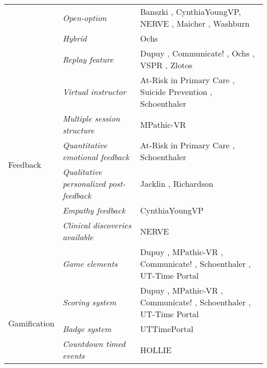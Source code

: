 \begin{table} [t]
{\begin{center}
\begin{tabular}{| p{1.8cm} | p{2cm} | p{8cm} |}
    \cline{2-3}
        & \emph{Open-option} & Banszki \cite{banszki2018clinical,quail2016student}, CynthiaYoungVP\cite{foster2016using}, NERVE
        \cite{hirumi2016advancingPart2,hirumi2016advancing,kleinsmith2015understanding}, Maicher \cite{maicher2017developing}, Washburn \cite{washburn2020virtual} \\
    \cline{2-3}
        & \emph{Hybrid} & Ochs \cite{ochs2019training}  \\
    \hline
        \multirow{8}{*}{Feedback} & \emph{Replay feature} & Dupuy \cite{dupuy2019virtual}, Communicate! \cite{jeuring2015communicate}, Ochs \cite{ochs2019training}, VSPR \cite{peddle2019exploring,peddle2019development}, Zlotos \cite{zlotos2016scenario}\\
    \cline{2-3}
        & \emph{Virtual instructor} & At-Risk in Primary Care \cite{albright2018using}, Suicide Prevention \cite{o2019suicide}, Schoenthaler \cite{schoenthaler2017simulated}\\
    \cline{2-3}
        & \emph{Multiple session structure} & MPathic-VR \cite{guetterman2019medical,kron2017using}  \\
    \cline{2-3}
        & \emph{Quantitative emotional feedback} & At-Risk in Primary Care \cite{albright2018using}, Schoenthaler \cite{schoenthaler2017simulated}\\
    \cline{2-3}
        & \emph{Qualitative personalized post-feedback} & Jacklin \cite{jacklin2019virtual,jacklin2018improving}, Richardson \cite{richardson2019virtual}\\
    \cline{2-3}
        & \emph{Empathy feedback} & CynthiaYoungVP \cite{foster2016using}\\
    \cline{2-3}
        & \emph{Clinical discoveries available} & NERVE
        \cite{hirumi2016advancingPart2,hirumi2016advancing,kleinsmith2015understanding}\\
    \cline{2-3}
        & \emph{Game elements} & Dupuy \cite{dupuy2019virtual}, MPathic-VR \cite{guetterman2019medical,kron2017using}, Communicate! \cite{jeuring2015communicate}, Schoenthaler \cite{schoenthaler2017simulated}, UT-Time Portal \cite{zielke2016beyond,zielke2016using}\\
    \hline
        \multirow{3}{*}{Gamification} & \emph{Scoring system} & Dupuy \cite{dupuy2019virtual}, MPathic-VR \cite{guetterman2019medical,kron2017using}, Communicate! \cite{jeuring2015communicate}, Schoenthaler \cite{schoenthaler2017simulated}, UT-Time Portal \cite{zielke2016beyond,zielke2016using}\\
    \cline{2-3}
        & \emph{Badge system} & UTTimePortal \cite{zielke2016beyond,zielke2016using}  \\
    \cline{2-3}
        & \emph{Countdown timed events} & HOLLIE \cite{adefila2020students}\\
    \hline
     \end{tabular}
\end{center}
}
\end{table}
\normalsize